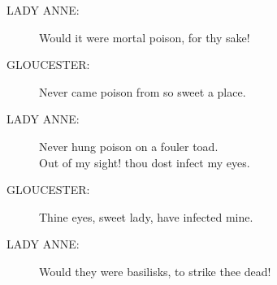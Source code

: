 \documentclass{article}
\begin{document}
\begin{description}
\item[LADY ANNE:] 
\hspace{1pt}Would it were mortal poison, for thy sake!\\
\end{description}
\begin{description}
\item[GLOUCESTER:] 
\hspace{1pt}Never came poison from so sweet a place.\\
\end{description}
\begin{description}
\item[LADY ANNE:] 
\hspace{1pt}Never hung poison on a fouler toad.\\
\hspace{1pt}Out of my sight! thou dost infect my eyes.\\
\end{description}
\begin{description}
\item[GLOUCESTER:] 
\hspace{1pt}Thine eyes, sweet lady, have infected mine.\\
\end{description}
\begin{description}
\item[LADY ANNE:] 
\hspace{1pt}Would they were basilisks, to strike thee dead!\\
\end{description}
\end{document}
